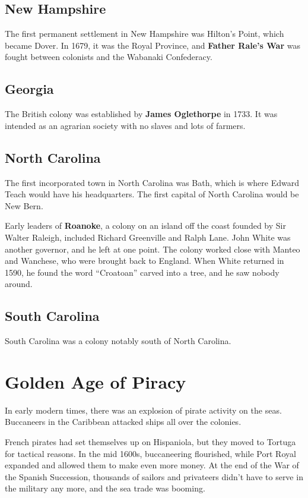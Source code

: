 \subsection*{New Hampshire}

The first permanent settlement in New Hampshire was Hilton's Point, which became Dover.
In 1679, it was the Royal Province,
and \textbf{Father Rale's War} was fought between colonists and the Wabanaki Confederacy.

\subsection*{Georgia}

The British colony was established by \textbf{James Oglethorpe} in 1733.
It was intended as an agrarian society with no slaves and lots of farmers.

\subsection*{North Carolina}

The first incorporated town in North Carolina was Bath, which is where Edward Teach would have his headquarters.
The first capital of North Carolina would be New Bern.

Early leaders of \textbf{Roanoke}, a colony on an island off the coast founded by Sir Walter Raleigh,
included Richard Greenville and Ralph Lane.
John White was another governor, and he left at one point.
The colony worked close with Manteo and Wanchese, who were brought back to England.
When White returned in 1590, he found the word ``Croatoan'' carved into a tree,
and he saw nobody around.

\subsection*{South Carolina}

South Carolina was a colony notably south of North Carolina.

\section{Golden Age of Piracy}

In early modern times, there was an explosion of pirate activity on the seas.
Buccaneers in the Caribbean attacked ships all over the colonies.

French pirates had set themselves up on Hispaniola,
but they moved to Tortuga for tactical reasons.
In the mid 1600s, buccaneering flourished,
while Port Royal expanded and allowed them to make even more money.
At the end of the War of the Spanish Succession,
thousands of sailors and privateers didn't have to serve in the military any more, and the sea trade was booming.

